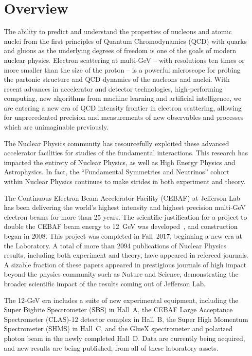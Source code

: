 \section{Overview}

The ability to predict and understand the properties of nucleons and atomic nuclei from the first principles of Quantum Chromodynamics (QCD) with quarks and gluons as the underlying degrees of freedom is one of the goals of modern nuclear physics. Electron scattering at multi-GeV -- with resolutions ten times or more smaller than the size of the proton -- is a powerful microscope for probing the partonic structure and QCD dynamics of the nucleons and nuclei. With recent advances in accelerator and detector technologies, high-performing computing, new algorithms from machine learning and artificial intelligence, we are entering a new era of QCD intensity frontier in electron scattering, allowing for unprecedented precision and measurements of new observables and processes which are unimaginable previously.

The Nuclear Physics community has resourcefully exploited these advanced accelerator facilities for studies of the fundamental interactions. This research has impacted the entirety of Nuclear Physics, as well as High Energy Physics and Astrophysics. In fact, the ``Fundamental Symmetries and Neutrinos'' cohort within Nuclear Physics continues to make strides in both experiment and theory.
  
The Continuous Electron Beam Accelerator Facility (CEBAF) at Jefferson Lab has been delivering the world's highest intensity and highest precision multi-GeV electron beams for more than 25 years. The scientific justification for a project to double the CEBAF beam energy to 12~GeV was developed~\cite{Dudek:2012vr}, and construction began in 2008. This project was completed in Fall~2017, beginning a new era at the Laboratory. A total of more than 2094 publications of Nuclear Physics results, including both experiment and theory, have appeared in refereed journals.  A sizable fraction of these papers appeared in prestigious journals of high impact beyond the physics community such as Nature and Science, demonstrating the broader scientific impact of the results coming out of Jefferson Lab. 

The 12-GeV era includes a suite of new experimental equipment, including the Super Bigbite Spectrometer (SBS) in Hall~A, the CEBAF Large Acceptance Spectrometer (CLAS)-12 detector complex in Hall~B, the Super High Momentum Spectrometer (SHMS) in Hall~C, and the GlueX spectrometer and polarized photon beam in the newly completed Hall~D. Data are currently being acquired, and new results are being published, from all of these laboratory assets.


